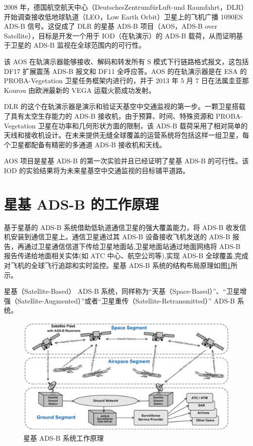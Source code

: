 2008 年，德国航空航天中心（DeutschesZentrumfürLuft-und Raumfahrt，DLR）开始调查接收低地球轨道（LEO，Low Earth Orbit）卫星上的飞机广播 1090ES ADS-B 信号。这促成了 DLR 的星基 ADS-B 项目（AOS，ADS-B over Satellite），目标是开发一个用于 IOD（在轨演示）的 ADS-B 载荷，从而证明基于卫星的 ADS-B 监视在全球范围内的可行性。

该 AOS 在轨演示器能够接收、解码和转发所有 S 模式下行链路格式报文，这包括 DF17 扩展震荡 ADS-B 报文和 DF11 全呼应答。AOS 的在轨演示器是在 ESA 的 PROBA-Vegetation 卫星任务框架内进行的，并于 2013 年 5 月 7 日在法属圭亚那 Kourou 由欧洲最新的 VEGA 运载火箭成功发射。

DLR 的这个在轨演示器是演示和验证天基空中交通监视的第一步。一颗卫星搭载了具有太空生存能力的 ADS-B 接收机，由于预算、时间、特殊资源和 PROBA-Vegetation 卫星在功率和几何形状方面的限制，该 ADS-B 载荷采用了相对简单的天线和接收机设计。在未来提供无缝全球覆盖的运营系统将包括这样一组卫星，每个卫星都配备有精密的多通道 ADS-B 接收机和天线。

AOS 项目是星基 ADS-B 的第一次实验并且已经证明了星基 ADS-B 的可行性。该 IOD 的实验结果将为未来星基空中交通监视的目标铺平道路。

\section{星基 ADS-B 的工作原理}

基于星基的 ADS-B 系统借助低轨道通信卫星的强大覆盖能力，将 ADS-B 收发信机安装到通信卫星上。通信卫星通过其 ADS-B 设备接收飞机发送的 ADS-B 报告，再通过卫星通信信道下传给卫星地面站,卫星地面站通过地面网络将 ADS-B 报告传递给地面相关实体(如 ATC 中心、航空公司等),实现 ADS-B 全球覆盖,完成对飞机的全球飞行追踪和实时监控。星基 ADS-B 系统的结构布局原理如图\ref{fig:satellite_ads-b_arichitecture}所示。

星基（Satellite-Based） ADS-B 系统，同样称为“天基（Space-Based）”、“卫星增强（Satellite-Augmented）”或者“卫星重传（Satellite-Retransmitted）” ADS-B 系统。

\begin{figure}[htbp]
\centering
\includegraphics[width=15cm]{pic/satellite_ads-b_arichitecture.png}
\caption{星基 ADS-B 系统工作原理}
\label{fig:satellite_ads-b_arichitecture}
\end{figure}
